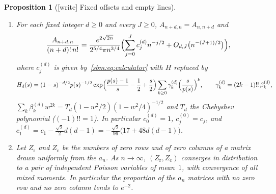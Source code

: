 \documentclass[11pt,letterpaper]{article}
\numberwithin{equation}{section}
\newtheorem{proposition}[theorem]{Proposition}
\theoremstyle{remark}\newtheorem{remark}[theorem]{Remark}
\begin{document}
\begin{proposition}[{[write]} Fixed offsets and empty lines]\label{sbm:prop:offset}
\begin{enumerate}
\item[(a)] For each fixed integer $d\ge0$ and every $J\ge0$,
 $A_{n+d,n}=A_{n,n+d}$ and
 \[
  \frac{A_{n+d,n}}{(n+d)!\,n!}=\frac{e^{2\sqrt{2n}}}{2^{5/4}\pi n^{3/4}}
  \Bigl(\sum_{j=0}^Jc^{(d)}_jn^{-j/2}+O_{d,J}\bigl(n^{-(J+1)/2}\bigr)\Bigr),
 \]
 where $c^{(d)}_j$ is given by~\eqref{sbm:eq:calculator} with $H$ replaced by
 \[
  H_d(s)=(1-s)^{-d/2}p(s)^{-1/2}
  \exp\Bigl(\frac{p(s)-1}s-\frac12+\frac s2\Bigr)
  \sum_{k\ge0}\gamma^{(d)}_k\Bigl(\frac s{p(s)}\Bigr)^k,
  \qquad \gamma^{(d)}_k=(2k-1)!!\,\beta^{(d)}_k,
 \]
 $\sum_k\beta^{(d)}_kw^{2k}=T_d(1-w^2/2)(1-w^2/4)^{-1/2}$ and $T_d$ the
 Chebyshev polynomial ($(-1)!!=1$). In particular $c^{(d)}_0=1$,
 $c^{(0)}_j=c_j$, and
 $c^{(d)}_1=c_1-\frac{\sqrt2}2d(d-1)=-\frac{\sqrt2}{96}\bigl(17+48d(d-1)\bigr)$.
\item[(b)] Let $Z_{\mathrm r}$ and $Z_{\mathrm c}$ be the numbers of zero
 rows and of zero columns of a matrix drawn uniformly from the $a_n$. As
 $n\to\infty$, $(Z_{\mathrm r},Z_{\mathrm c})$ converges in distribution to a
 pair of independent Poisson variables of mean~$1$, with convergence of all
 mixed moments. In particular the proportion of the $a_n$ matrices with no
 zero row and no zero column tends to $e^{-2}$.
\end{enumerate}
\end{proposition}
\end{document}
